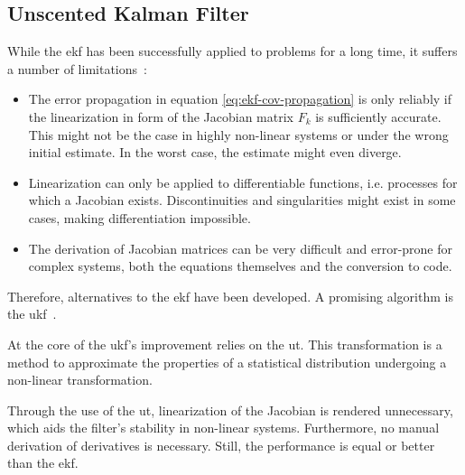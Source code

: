 \subsection{Unscented Kalman Filter}
While the \gls{ekf} has been successfully applied to problems for a long time, it suffers a number of limitations~\cite[p.~402]{Julier.2004}:
\begin{itemize}
\item The error propagation in equation \ref{eq:ekf-cov-propagation} is only reliably if the linearization in form of the Jacobian matrix $F_k$ is sufficiently accurate. This might not be the case in highly non-linear systems or under the wrong initial estimate. In the worst case, the estimate might even diverge.
\item Linearization can only be applied to differentiable functions, i.e. processes for which a Jacobian exists. Discontinuities and singularities might exist in some cases, making differentiation impossible.
\item The derivation of Jacobian matrices can be very difficult and error-prone for complex systems, both the equations themselves and the conversion to code.
\end{itemize}
Therefore, alternatives to the \gls{ekf} have been developed. A promising algorithm is the \gls{ukf}~\cite{SimonJ.Julier.1997}.

At the core of the \gls{ukf}'s improvement relies on the \gls{ut}. This transformation is a method to approximate the properties of a statistical distribution undergoing a non-linear transformation.

Through the use of the \gls{ut}, linearization of the Jacobian is rendered unnecessary, which aids the filter's stability in non-linear systems. Furthermore, no manual derivation of derivatives is necessary. Still, the performance is equal or better than the \gls{ekf}.
